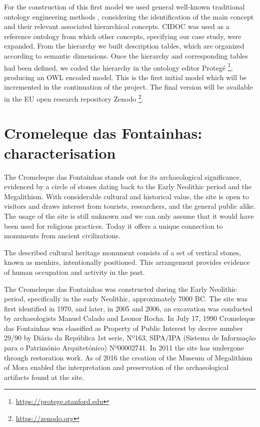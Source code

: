 \documentclass[10pt]{report}
\begin{document}
For the construction of this first model we used general well-known traditional ontology engineering methods \cite{gomez1999ontological}, considering the identification of the main concept and their relevant associated hierarchical concepts. CIDOC was used as a reference ontology from which other concepts, specifying our case study, were expanded. From the hierarchy we built description tables, which are organized according to semantic dimensions. Once the hierarchy and corresponding tables had been defined, we coded the hierarchy in the ontology editor Protegé \footnote{\url{https://protege.stanford.edu}}, producing an OWL encoded model. This is the first initial model which will be incremented in the continuation of the project. The final version will be available in the EU open research repository Zenodo \footnote{\url{https://zenodo.org}}.



\section{Cromeleque das Fontainhas: characterisation}

 The Cromeleque das Fontainhas stands out for its archaeological significance, evidenced by a circle of stones %
dating back to the Early Neolithic period and the Megalithism. With considerable cultural and historical value, the site is open to visitors and draws interest from tourists, researchers, and the general public alike. The usage of the site is still unknown and we can only assume that it would have been used for religious practices. Today it offers a unique connection to monuments from ancient civilizations. %

The described cultural heritage monument consists of a set of vertical stones, known as menhirs, intentionally positioned. This arrangement provides evidence of human occupation and activity in the past.

The Cromeleque das Fontainhas was constructed during the Early Neolithic period, specifically in the early Neolithic, approximately  7000 BC. The site was first identified in 1970, and later, in 2005 and 2006, an excavation was conducted by archaeologists Manuel Calado and Leonor Rocha. In July 17, 1990 Cromeleque das Fontainhas was classified as Property of Public Interest by decree number 29/90 by Diário da República 1st serie, Nº163, SIPA/IPA (Sistema de Informação para o Património Arquitetónico) Nº00002741. In 2011 the site has undergone through  restoration work. As of 2016 the creation of the Museum of Megalithism of Mora enabled the interpretation and preservation of the archaeological artifacts found at the site. %
\end{document}
